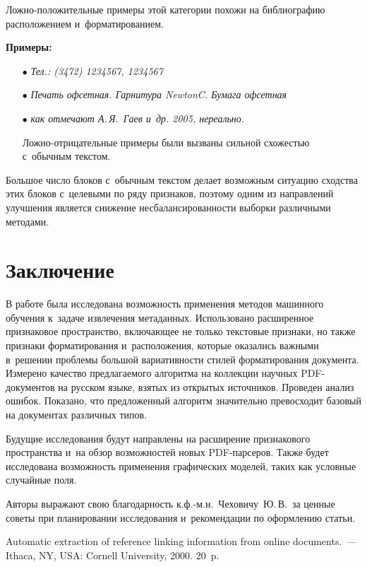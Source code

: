 \begin{multicols}{2}
Ложно-положительные примеры этой категории похожи на биб\-лио\-гра\-фию 
расположением и~форматированием.

\textbf{Примеры:}

\begin{itemize}
\item[$\bullet$]
\textit{Тел.: (3472) 1234567, 1234567}

\item[$\bullet$]
\textit{Печать офсетная. Гарнитура NewtonC. Бумага офсетная}

\item[$\bullet$]
\textit{как отмечают А.\,Я.~Гаев и~др. 2005, нереально.}


Ложно-отрицательные примеры были вызваны сильной схо\-жестью с~обычным текс\-том.
\end{itemize}


Большое число блоков с~обычным текст\-ом делает возможным ситуацию сходства этих 
блоков с~целевыми по ряду признаков, поэтому одним из на\-прав\-ле\-ний улуч\-ше\-ния 
является снижение несбалансированности выборки различными методами.
    
    
\section{Заключение}

В работе была исследована возможность применения методов машинного обучения 
к~задаче извлечения метаданных. Использовано расширенное признаковое про\-стран\-ст\-во, 
вклю\-ча\-ющее не только текс\-то\-вые признаки, но также признаки форматирования 
и~расположения, которые оказались важ\-ны\-ми в~решении проб\-ле\-мы большой вариативности 
стилей форматирования документа. Измерено качество предлагаемого алгоритма на 
коллекции научных PDF-до\-ку\-мен\-тов на рус\-ском языке, взятых из открытых 
источников. Проведен анализ ошибок. Показано, что предложенный алгоритм 
значительно превосходит базовый на документах различных типов.

Будущие исследования будут направлены на расширение признакового пространства 
и~на обзор возможностей новых PDF-пар\-се\-ров. Также будет исследована воз\-мож\-ность 
применения графических моделей, таких как услов\-ные случайные поля.

\bigskip

Авторы выражают свою благодарность к.ф.-м.н.\ Чеховичу~Ю.\,В.\ за ценные советы 
при планировании исследования и~рекомендации по оформлению статьи.


{\small\frenchspacing
 {%
 \begin{thebibliography}{99}
   Automatic extraction of reference linking information 
from online documents.~--- Ithaca, NY, USA: Cornell University, 2000. 20~p.


\end{thebibliography}}}
\end{multicols}
